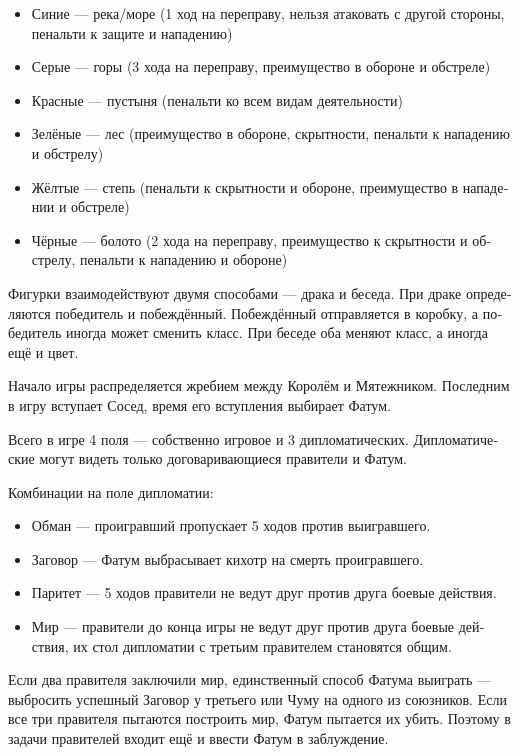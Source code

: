 \documentclass[a4paper,12pt,fleqn]{book}\usepackage{polyglossia}\setdefaultlanguage[babelshorthands=true]{russian}\setotherlanguage{english}\defaultfontfeatures{Ligatures=TeX,Mapping=tex-text}\usepackage{xcolor}\newcommand{\ml}[3]{#2}
\begin{document}
{\begin{itemize}
\item Синие --- река/море (1 ход на переправу, нельзя атаковать с другой стороны, пенальти к защите и нападению)
\item Серые --- горы (3 хода на переправу, преимущество в обороне и обстреле)
\item Красные --- пустыня (пенальти ко всем видам деятельности)
\item Зелёные --- лес (преимущество в обороне, скрытности, пенальти к нападению и обстрелу)
\item Жёлтые --- степь (пенальти к скрытности и обороне, преимущество в нападении и обстреле)
\item Чёрные --- болото (2 хода на переправу, преимущество к скрытности и обстрелу, пенальти к нападению и обороне)
\end{itemize}

Фигурки взаимодействуют двумя способами --- драка и беседа.
При драке определяются победитель и побеждённый.
Побеждённый отправляется в коробку, а победитель иногда может сменить класс.
При беседе оба меняют класс, а иногда ещё и цвет.

Начало игры распределяется жребием между Королём и Мятежником.
Последним в игру вступает Сосед, время его вступления выбирает Фатум.

Всего в игре 4 поля --- собственно игровое и 3 дипломатических.
Дипломатические могут видеть только договаривающиеся правители и Фатум.

Комбинации на поле дипломатии:

\begin{itemize}
\item Обман --- проигравший пропускает 5 ходов против выигравшего.
\item Заговор --- Фатум выбрасывает кихотр на смерть проигравшего.
\item Паритет --- 5 ходов правители не ведут друг против друга боевые действия.
\item Мир --- правители до конца игры не ведут друг против друга боевые действия, их стол дипломатии с третьим правителем становятся общим.
\end{itemize}

Если два правителя заключили мир, единственный способ Фатума выиграть --- выбросить успешный Заговор у третьего или Чуму на одного из союзников.
Если все три правителя пытаются построить мир, Фатум пытается их убить.
Поэтому в задачи правителей входит ещё и ввести Фатум в заблуждение.

}
\end{document}

